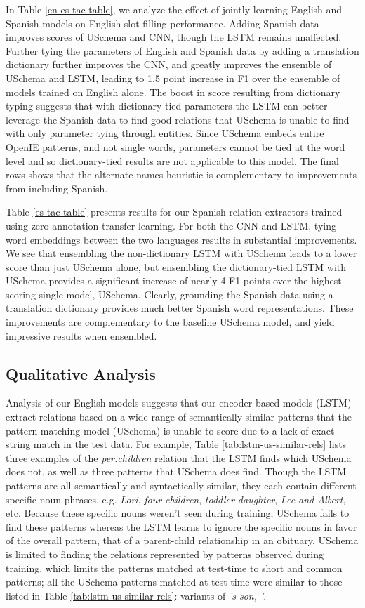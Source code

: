 In Table \ref{en-es-tac-table}, we analyze the effect of jointly learning English and Spanish models on English slot filling performance.  Adding Spanish data improves scores of USchema and CNN, though the LSTM remains unaffected. Further tying the parameters of English and Spanish data by adding a translation dictionary further improves the CNN, and greatly improves the ensemble of USchema and LSTM, leading to 1.5 point increase in F1 over the ensemble of models trained on English alone. The boost in score resulting from dictionary typing suggests that with dictionary-tied parameters the LSTM can better leverage the Spanish data to find good relations that USchema is unable to find with only parameter tying through entities. Since USchema embeds entire OpenIE patterns, and not single words, parameters cannot be tied at the word level and so dictionary-tied results are not applicable to this model. The final rows shows that the alternate names heuristic is complementary to improvements from including Spanish. 

Table \ref{es-tac-table} presents results for our Spanish relation extractors trained using zero-annotation transfer learning. For both the CNN and LSTM, tying word embeddings between the two languages results in substantial improvements. We see that ensembling the non-dictionary LSTM with USchema leads to a lower score than just USchema alone, but ensembling the dictionary-tied LSTM with USchema provides a significant increase of nearly 4 F1 points over the highest-scoring single model, USchema. Clearly, grounding the Spanish data using a translation dictionary provides much better Spanish word representations. These improvements are complementary to the baseline USchema model, and yield impressive results when ensembled. 


\subsection{Qualitative Analysis \label{sec:qual-anal}}

Analysis of our English models suggests that our encoder-based models (LSTM) extract relations based on a wide range of semantically similar patterns that the pattern-matching model (USchema) is unable to score due to a lack of exact string match in the test data. For example, Table \ref{tab:lstm-us-similar-rels} lists three examples of the \emph{per:children} relation that the LSTM finds which USchema does not, as well as three patterns that USchema does find. Though the LSTM patterns are all semantically and syntactically similar, they each contain different specific noun phrases, e.g. \emph{Lori}, \emph{four children}, \emph{toddler daughter}, \emph{Lee and Albert}, etc. Because these specific nouns weren't seen during training, USchema fails to find these patterns whereas the LSTM learns to ignore the specific nouns in favor of the overall pattern, that of a parent-child relationship in an obituary. USchema is limited to finding the relations represented by patterns observed during training, which limits the patterns matched at test-time to short and common patterns; all the USchema patterns matched at test time were similar to those listed in Table \ref{tab:lstm-us-similar-rels}: variants of \emph{'s son, '}. 


